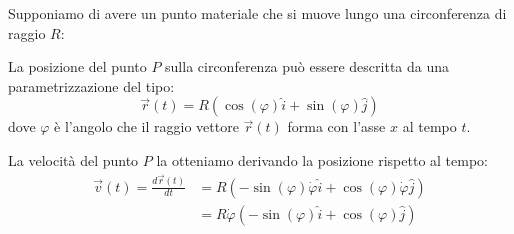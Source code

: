 \begin{example}
    Supponiamo di avere un punto materiale che si muove lungo una circonferenza di raggio $R$:

    \begin{figure}[H]
        \centering
    \end{figure}

    La posizione del punto $P$ sulla circonferenza può essere descritta da una parametrizzazione del tipo:
    \begin{equation*}
        \vec r(t) = R(\cos(\varphi)\hat i + \sin(\varphi)\hat j)
    \end{equation*}
    dove $\varphi$ è l'angolo che il raggio vettore $\vec r(t)$ forma con l'asse $x$ al tempo $t$.

    La velocità del punto $P$ la otteniamo derivando la posizione rispetto al tempo:
    \begin{align*}
        \vec v(t) = \frac{d \vec r(t)}{dt} &= R(-\sin(\varphi)\dot{\varphi}\hat i + \cos(\varphi)\dot{\varphi}\hat j) \\
        &= R\dot{\varphi}(-\sin(\varphi)\hat i + \cos(\varphi)\hat j)
    \end{align*}


\end{example}
